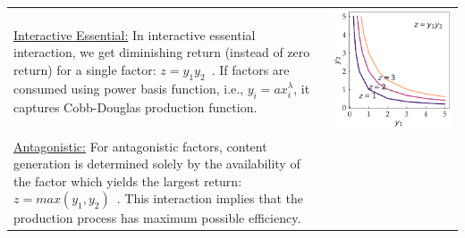 \begin{table}[h!]
\begin{tabular}{m{}c}
    \vspace{-5pt}
    \uline{Interactive Essential:} In interactive essential interaction, we get diminishing return (instead of zero return) for a single factor: $z = y_1y_2$~\cite{tilman1980}. If factors are consumed using power basis function, i.e., $y_i = ax^\lambda_i$, it captures Cobb-Douglas production function.
    &
    \begin{minipage}{.17\textwidth}
      \includegraphics[width=\textwidth, height=.975\textwidth]{Figures/Interactive_Essential.pdf}
    \end{minipage}
    \\
    \vspace{-5pt}
    \uline{Antagonistic:} For antagonistic factors, content generation is determined solely by the availability of the factor which yields the largest return: $z = max(y_1, y_2)$~\cite{tilman1980}. This interaction implies that the production process has maximum possible efficiency. 
    &
    \begin{minipage}{.17\textwidth}

\end{minipage}
\end{tabular}
\end{table}
